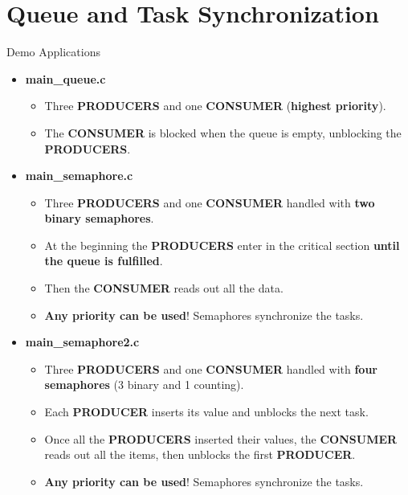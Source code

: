 \documentclass{beamer}
\begin{document}
\section{Queue and Task Synchronization}
\begin{frame}{Demo Applications}
        \begin{itemize}
        \item \textbf{main\_queue.c}
        \begin{itemize}
            \item Three \textbf{PRODUCERS} and one \textbf{CONSUMER} (\textbf{highest priority}).
            \item The \textbf{CONSUMER} is blocked when the queue is empty, unblocking the \textbf{PRODUCERS}.
        \end{itemize}
        \item \textbf{main\_semaphore.c}
        \begin{itemize}
            \item Three \textbf{PRODUCERS} and one \textbf{CONSUMER} handled with \textbf{two binary semaphores}.
            \item At the beginning the \textbf{PRODUCERS} enter in the critical section \textbf{until the queue is fulfilled}.
            \item Then the \textbf{CONSUMER} reads out all the data.
            \item \textbf{Any priority can be used}! Semaphores synchronize the tasks.
        \end{itemize}
        \item \textbf{main\_semaphore2.c}
        \begin{itemize}
            \item Three \textbf{PRODUCERS} and one \textbf{CONSUMER} handled with \textbf{four semaphores} (3 binary and 1 counting).
            \item Each \textbf{PRODUCER} inserts its value and unblocks the next task.
            \item Once all the \textbf{PRODUCERS} inserted their values, the \textbf{CONSUMER} reads out all the items, then unblocks the first \textbf{PRODUCER}.
            \item \textbf{Any priority can be used}! Semaphores synchronize the tasks.
        \end{itemize}
    \end{itemize}
\end{frame}
\end{document}

